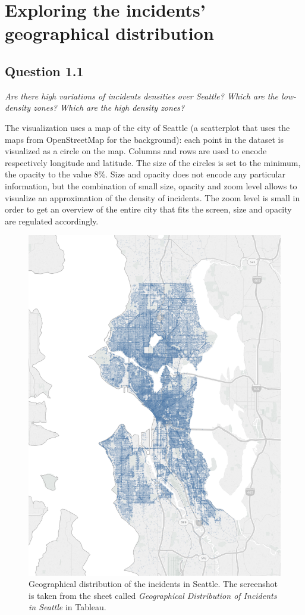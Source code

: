 \section{Exploring the incidents' geographical distribution}

\subsection*{Question 1.1}
\textit{Are there high variations of incidents densities over Seattle? Which are the low-density zones? Which are the high density zones?}

The visualization uses a map of the city of Seattle (a scatterplot that uses the maps from OpenStreetMap for the background):
each point in the dataset is visualized as a circle on the map.
Columns and rows are used to encode respectively longitude and latitude.
The size of the circles is set to the minimum, the opacity to the value $8\%$.
Size and opacity does not encode any particular information, but the combination of small size, opacity and zoom level allows to visualize an approximation of the density of incidents.
The zoom level is small in order to get an overview of the entire city that fits the screen, size and opacity are regulated accordingly.

\begin{figure}[h]
	\centering
	\includegraphics[width=.75\columnwidth]{figures/1_1_geographical_distribution_incidents}
	\caption{Geographical distribution of the incidents in Seattle. The screenshot is taken from the sheet called \textit{Geographical Distribution of Incidents in Seattle} in Tableau.}
	\label{fig:1_1_geographical_distribution_incidents}
\end{figure}

